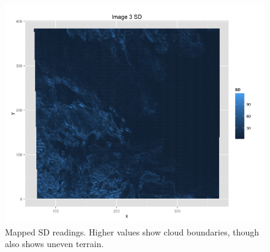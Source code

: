 \documentclass{article}\usepackage[]{graphicx}\usepackage[]{color}
\begin{document}
\begin{figure}
\includegraphics[scale = .35]{Image3SD.png}
\caption{Mapped SD readings. Higher values show cloud boundaries, though also shows uneven terrain.}
\end{figure}
\end{document}
